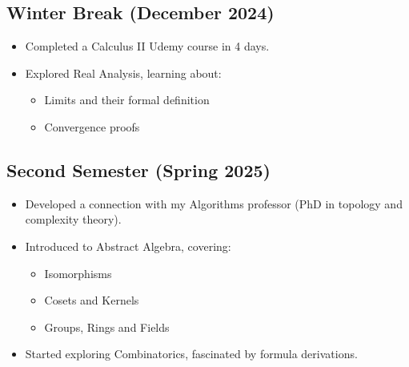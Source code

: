\documentclass{article}
\begin{document}
\subsection{Winter Break (December 2024)}
\begin{itemize}
    \item Completed a Calculus II Udemy course in 4 days.
    \item Explored Real Analysis, learning about:
    \begin{itemize}
        \item Limits and their formal definition
        \item Convergence proofs
    \end{itemize}
\end{itemize}

\subsection{Second Semester (Spring 2025)}
\begin{itemize}
    \item Developed a connection with my Algorithms professor (PhD in topology and complexity theory).
    \item Introduced to Abstract Algebra, covering:
    \begin{itemize}
        \item Isomorphisms
        \item Cosets and Kernels
        \item Groups, Rings and Fields
    \end{itemize}
    \item Started exploring Combinatorics, fascinated by formula derivations.
\end{itemize}
\break
\end{document}
